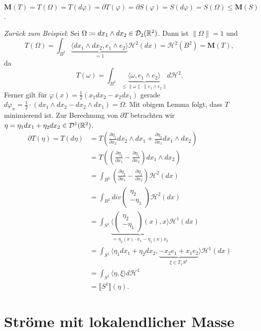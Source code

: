 \documentclass[a4paper,twoside,DIV15,BCOR12mm]{scrbook}
\newcommand{\HM}{\mathscr H}
\newcommand{\MN}{\mathbf M}
\begin{document}
\begin{beweis}
$\MN(T) = T(\Omega) = T(d\varphi) = \partial T(\varphi) = \partial S(\varphi) = S(d\varphi) = S(\Omega) \leq \MN(S)$.
\end{beweis}

\emph{Zurück zum Beispiel}: Sei $\Omega \da dx_1 \wedge dx_2 \in \mathcal D_2(\MdR^2)$. Dann ist $\|\Omega\|=1$ und
$$
	T(\Omega) = \int_{B^2} \underbrace{\langle dx_1 \wedge dx_2, e_1 \wedge e_2 \rangle}_{=1} \HM^2(dx) = \HM^2(B^2) = \MN(T),
$$
da
$$
	T(\omega) = \int_{B^2} \underbrace{\langle \omega, e_1\wedge e_2 \rangle}_{\leq \|\omega\|\cdot\|e_1\wedge e_2\|} d\HM^2.
$$
Ferner gilt für $\varphi(x) = \frac12 (x_1 dx_2 - x_2 dx_1)$ gerade $d\varphi_x = \frac12 \cdot (dx_1 \wedge dx_2 - dx_2 \wedge dx_1) = \Omega$. Mit obigem Lemma folgt, dass $T$ minimierend ist. Zur Berechnung von 
$\partial T$ betrachten wir $\eta = \eta_1 dx_1 + \eta_2 dx_2 \in \mathcal D^1(\mathbb{R}^2)$.
\begin{align*}
	\partial T(\eta) = T(d\eta) &= T(\frac{\partial \eta_1}{\partial x_2} dx_2 \wedge dx_1 + \frac{\partial \eta_2}{\partial x_1} dx_1 \wedge dx_2) \\
	&= T((\frac{\partial \eta_2}{\partial x_1} - \frac{\partial \eta_1}{\partial x_2}) dx_1 \wedge dx_2) \\
	&= \int_{B^2} (\frac{\partial \eta_2}{\partial x_1} - \frac{\partial \eta_1}{\partial x_2}) \HM^2(dx) \\
	&= \int_{B^2} div \begin{pmatrix} \eta_2 \\ -\eta_1 \end{pmatrix} \HM^2(dx) \\
	&= \int_{S^1} \underbrace{\langle \begin{pmatrix}\eta_2\\-\eta_1\end{pmatrix}(x),x \rangle}_{= \eta_2(x)\cdot x_1 - \eta_1(x) x_2} \HM^1(dx) \\
	&= \int_{S^1} \langle \eta_1 dx_1 + \eta_2 dx_2, \underbrace{-x_2 e_1 + x_1 e_2}_{\xi \in T_x S^1} \rangle \HM^1(dx) \\
	&= \int_{S^1} \langle \eta, \xi \rangle d\HM^1 \\
	&= \llbracket S^1 \rrbracket (\eta).
\end{align*}


\section{Ströme mit lokalendlicher Masse}
\end{document}

